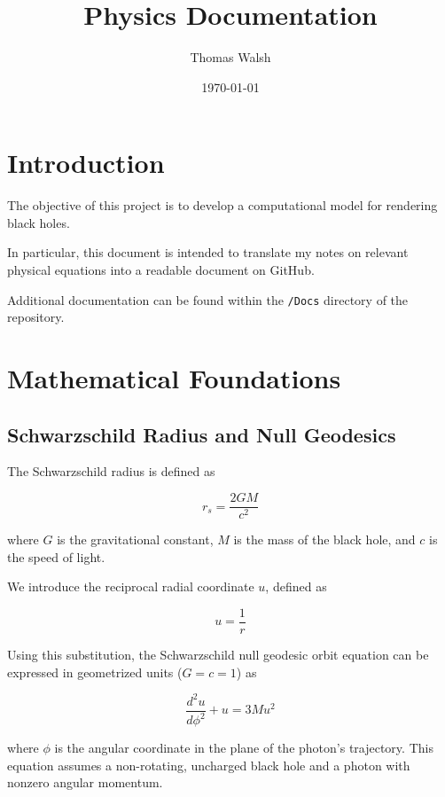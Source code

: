 \documentclass[12pt]{article}
\title{Physics Documentation}
\author{Thomas Walsh}
\date{\today}
\numberwithin{equation}{section}
\begin{document}
\maketitle
\tableofcontents
\newpage

\section{Introduction}

The objective of this project is to develop a computational 
model for rendering black holes.

In particular, this document is intended to translate my 
notes on relevant physical equations into a readable 
document on GitHub.

Additional documentation can be found within the 
\texttt{/Docs} directory of the repository.

\newpage

\section{Mathematical Foundations}

\subsection{Schwarzschild Radius and Null Geodesics}

The Schwarzschild radius is defined as

\begin{equation}
    r_s = \frac{2GM}{c^2}
    \label{eq:schwarzschild_radius}
\end{equation}

where $G$ is the gravitational constant, 
$M$ is the mass of the black hole, and 
$c$ is the speed of light.

We introduce the reciprocal radial coordinate $u$, defined as

\begin{equation}
    u = \frac{1}{r}
\end{equation}

Using this substitution, the Schwarzschild null geodesic 
orbit equation can be expressed in geometrized units 
($G = c = 1$) as

\begin{equation}
    \frac{d^2u}{d\phi^2} + u = 3Mu^2
    \label{eq:orbit}
\end{equation}

where $\phi$ is the angular coordinate in the plane of 
the photon's trajectory. This equation assumes a 
non-rotating, uncharged black hole and a photon with 
nonzero angular momentum.
\end{document}
